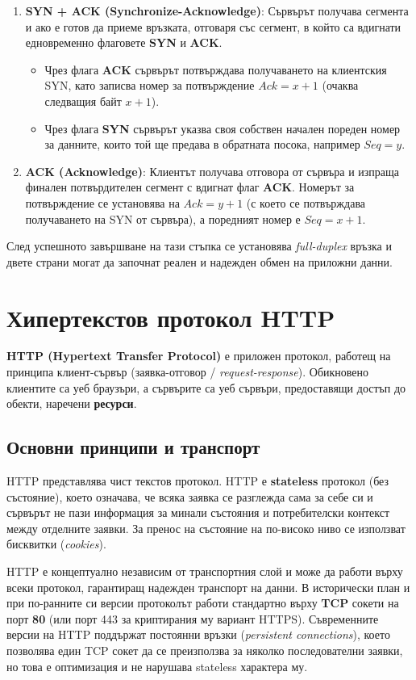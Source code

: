 \documentclass{scrartcl}
\begin{document}
\begin{FlushLeft}
\begin{enumerate}
    \item \textbf{SYN + ACK (Synchronize-Acknowledge)}: Сървърът получава сегмента и ако е готов да приеме връзката, отговаря със сегмент, в който са вдигнати едновременно флаговете \textbf{SYN} и \textbf{ACK}. 
    \begin{itemize}
        \item Чрез флага \textbf{ACK} сървърът потвърждава получаването на клиентския SYN, като записва номер за потвърждение $Ack = x + 1$ (очаква следващия байт $x+1$).
        \item Чрез флага \textbf{SYN} сървърът указва своя собствен начален пореден номер за данните, които той ще предава в обратната посока, например $Seq = y$.
    \end{itemize}
    
    \item \textbf{ACK (Acknowledge)}: Клиентът получава отговора от сървъра и изпраща финален потвърдителен сегмент с вдигнат флаг \textbf{ACK}. Номерът за потвърждение се установява на $Ack = y + 1$ (с което се потвърждава получаването на SYN от сървъра), а поредният номер е $Seq = x + 1$.
\end{enumerate}

След успешното завършване на тази стъпка се установява \textit{full-duplex} връзка и двете страни могат да започнат реален и надежден обмен на приложни данни.


\section{Хипертекстов протокол HTTP}

\textbf{HTTP (Hypertext Transfer Protocol)} е приложен протокол, работещ на принципа клиент-сървър (заявка-отговор / \textit{request-response}). Обикновено клиентите са уеб браузъри, а сървърите са уеб сървъри, предоставящи достъп до обекти, наречени \textbf{ресурси}.

\subsection{Основни принципи и транспорт}
HTTP представлява чист текстов протокол. HTTP е \textbf{stateless} протокол (без състояние), което означава, че всяка заявка се разглежда сама за себе си и сървърът не пази информация за минали състояния и потребителски контекст между отделните заявки. За пренос на състояние на по-високо ниво се използват бисквитки (\textit{cookies}).

HTTP е концептуално независим от транспортния слой и може да работи върху всеки протокол, гарантиращ надежден транспорт на данни. В исторически план и при по-ранните си версии протоколът работи стандартно върху \textbf{TCP} сокети на порт \textbf{80} (или порт 443 за криптирания му вариант HTTPS). Съвременните версии на HTTP поддържат постоянни връзки (\textit{persistent connections}), което позволява един TCP сокет да се преизползва за няколко последователни заявки, но това е оптимизация и не нарушава stateless характера му.


\end{FlushLeft}
\end{document}
